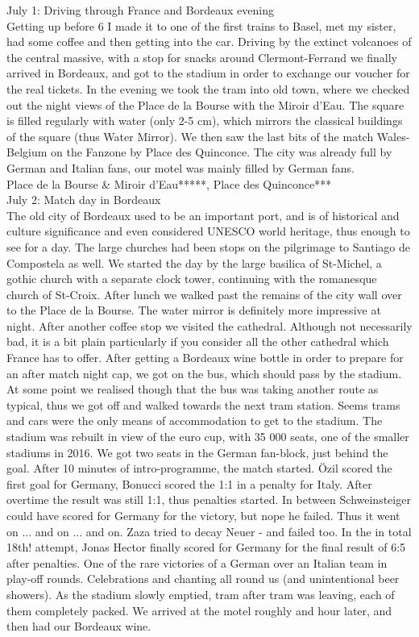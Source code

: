 July 1: Driving through France and Bordeaux evening\\
Getting up before 6 I made it to one of the first trains to Basel, met my sister, had some coffee and then getting into the car. Driving by the extinct volcanoes of the central massive, with a stop for snacks around Clermont-Ferrand we finally arrived in Bordeaux, and got to the stadium in order to exchange our voucher for the real tickets. In the evening we took the tram into old town, where we checked out the night views of the Place de la Bourse with the Miroir d'Eau. The square is filled regularly with water (only 2-5 cm), which mirrors the classical buildings of the square (thus Water Mirror). We then saw the last bits of the match Wales-Belgium on the Fanzone by Place des Quinconce. The city was already full by German and Italian fans, our motel was mainly filled by German fans.\\

Place de la Bourse \& Miroir d'Eau*****, Place des Quinconce***\\

July 2: Match day in Bordeaux\\
The old city of Bordeaux used to be an important port, and is of historical and culture significance and even considered UNESCO world heritage, thus enough to see for a day. The large churches had been stops on the pilgrimage to Santiago de Compostela as well. We started the day by the large basilica of St-Michel, a gothic church with a separate clock tower, continuing with the romanesque church of St-Croix. After lunch we walked past the remains of the city wall over to the Place de la Bourse. The water mirror is definitely more impressive at night. After another coffee stop we visited the cathedral. Although not necessarily bad, it is a bit plain particularly if you consider all the other cathedral which France has to offer. After getting a Bordeaux wine bottle in order to prepare for an after match night cap, we got on the bus, which should pass by the stadium. At some point we realised though that the bus was taking another route as typical, thus we got off and walked towards the next tram station. Seems trams and cars were the only means of accommodation to get to the stadium. The stadium was rebuilt in view of the euro cup, with 35 000 seats, one of the smaller stadiums in 2016. We got two seats in the German fan-block, just behind the goal. After 10 minutes of intro-programme, the match started. \"Ozil scored the first goal for Germany, Bonucci scored the 1:1 in a penalty for Italy. After overtime the result was still 1:1, thus penalties started. In between Schweinsteiger could have scored for Germany for the victory, but nope he failed. Thus it went on ... and on ... and on. Zaza tried to decay Neuer - and failed too. In the in total 18th! attempt, Jonas Hector finally scored for Germany for the final result of 6:5 after penalties. One of the rare victories of a German over an Italian team in play-off rounds. Celebrations and chanting all round us (and unintentional beer showers). As the stadium slowly emptied, tram after tram was leaving, each of them completely packed. We arrived at the motel roughly and hour later, and then had our Bordeaux wine.\\

